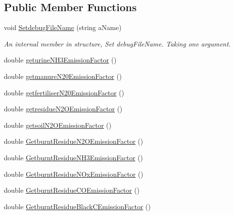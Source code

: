 \subsection*{Public Member Functions}
\begin{DoxyCompactItemize}
\item 
void \mbox{\hyperlink{struct_global_vars_1_1zone_specific_data_aca3aef5da8c090939b0184077cee32fb}{Setdebug\+File\+Name}} (string a\+Name)
\begin{DoxyCompactList}\small\item\em An internal member in structure, Set debug\+File\+Name. Taking one argument. \end{DoxyCompactList}\item 
double \mbox{\hyperlink{struct_global_vars_1_1zone_specific_data_ae90609d5b7cd149c5c294fefb9764636}{geturine\+N\+H3\+Emission\+Factor}} ()
\item 
double \mbox{\hyperlink{struct_global_vars_1_1zone_specific_data_a2b373b42989ed08ba5dea023efa0841d}{getmanure\+N20\+Emission\+Factor}} ()
\item 
double \mbox{\hyperlink{struct_global_vars_1_1zone_specific_data_a315abec24440fe6abb6a88f4835cd3fa}{getfertiliser\+N20\+Emission\+Factor}} ()
\item 
double \mbox{\hyperlink{struct_global_vars_1_1zone_specific_data_a982c21d86ca8d221f4ff9f9fd79248d9}{getresidue\+N2\+O\+Emission\+Factor}} ()
\item 
double \mbox{\hyperlink{struct_global_vars_1_1zone_specific_data_af4de6e0c1faebf01ee86c89ed72aaa2a}{getsoil\+N2\+O\+Emission\+Factor}} ()
\item 
double \mbox{\hyperlink{struct_global_vars_1_1zone_specific_data_a815b0b00dbb46f60ae07a381a2eb5c63}{Getburnt\+Residue\+N2\+O\+Emission\+Factor}} ()
\item 
double \mbox{\hyperlink{struct_global_vars_1_1zone_specific_data_ac99a6a99127e34f98264a81a3fef7ba7}{Getburnt\+Residue\+N\+H3\+Emission\+Factor}} ()
\item 
double \mbox{\hyperlink{struct_global_vars_1_1zone_specific_data_a9fe78215b1675b96357f91238e6b4995}{Getburnt\+Residue\+N\+Ox\+Emission\+Factor}} ()
\item 
double \mbox{\hyperlink{struct_global_vars_1_1zone_specific_data_a1541c28751b72a49b5682656767b8c7c}{Getburnt\+Residue\+C\+O\+Emission\+Factor}} ()
\item 
double \mbox{\hyperlink{struct_global_vars_1_1zone_specific_data_affd0301d1e72fbef68b346988765e5e5}{Getburnt\+Residue\+Black\+C\+Emission\+Factor}} ()

\end{DoxyCompactItemize}
